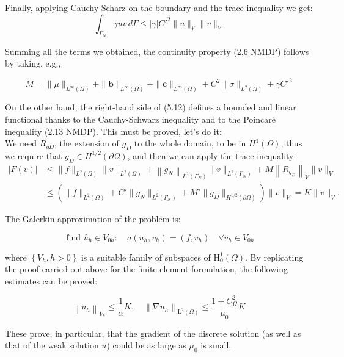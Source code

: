 \documentclass[11pt]{book}
\begin{document}
Finally, applying Cauchy Scharz on the boundary and the trace inequality we get:
$$\int_{\Gamma_N} \gamma u v \, d\Gamma \leq |\gamma| C'^2 \|u\|_{V} \|v\|_V $$




Summing all the terms we obtained, the continuity property (2.6  NMDP) follows by taking, e.g.,

\begin{equation}
M=\|\mu\|_{L^{\infty}(\Omega)}+\|\mathbf{b}\|_{L^{\infty}(\Omega)}+\|\mathbf{c}\|_{L^{\infty}(\Omega)}+ C^{2}\|\sigma\|_{L^{2}(\Omega)} + \gamma C'^2
\end{equation}


On the other hand, the right-hand side of (5.12) defines a bounded and linear functional thanks to the Cauchy-Schwarz inequality and to the Poincaré inequality (2.13 NMDP).  This must be proved, let's do it:\\
We need $R_{gD}$, the extension of $g_D$ to the whole domain, to be in $H^1(\Omega)$, thus we require that $g_D \in H^{1/2}(\partial \Omega)$, and then we can apply the trace inequality:
$$
\begin{aligned}
|F(v)| & \leq\|f\|_{L^{2}(\Omega)}\|v\|_{L^{2}(\Omega)}+\left\|g_{N}\right\|_{L^{2}\left(\Gamma_{N}\right)}\|v\|_{L^{2}\left(\Gamma_{N}\right)}+M\left\|R_{g_{D}}\right\|_{V}\|v\|_{V} \\
&\leq \left(\|f\|_{L^{2}(\Omega)} + C' \|g_{N}\|_{L^{2}(\Gamma_{N})} + M' \|g_{D}\|_{H^{1/2}(\partial \Omega)}\right) \|v\|_{V} = K \|v\|_{V}.
\end{aligned}
$$


The Galerkin approximation of the problem is:

\begin{equation}
\text { find } \tilde{u_{h}} \in V_{0h}: \quad a\left(u_{h}, v_{h}\right)=\left(f, v_{h}\right) \quad \forall v_{h} \in V_{0h} 
\end{equation}


where $\left\{V_{h}, h>0\right\}$ is a suitable family of subspaces of $\mathrm{H}_{0}^{1}(\Omega)$. By replicating the proof carried out above for the finite element formulation, the following estimates can be proved:

$$
\left\|u_{h}\right\|_{V_h} \leq \frac{1}{\alpha}K, \quad\left\|\nabla u_{h}\right\|_{\mathrm{L}^{2}(\Omega)} \leq \frac{1+C_{\Omega}^2}{\mu_{0}}K
$$

These prove, in particular, that the gradient of the discrete solution (as well as that of the weak solution $u$) could be as large as $\mu_{0}$ is small.
\end{document}
